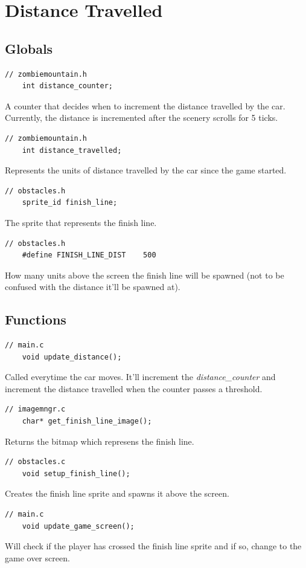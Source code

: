\documentclass{article}
\begin{document}
\section{Distance Travelled}
\subsection*{Globals}
\begin{lstlisting}[style=CStyle]
	// zombiemountain.h
	int distance_counter;
\end{lstlisting}
A counter that decides when to increment the distance travelled by the car. Currently, the distance is incremented after the scenery scrolls for 5 ticks.
\begin{lstlisting}[style=CStyle]
	// zombiemountain.h
	int distance_travelled;
\end{lstlisting}
Represents the units of distance travelled by the car since the game started. 
\begin{lstlisting}[style=CStyle]
	// obstacles.h
	sprite_id finish_line;
\end{lstlisting}
The sprite that represents the finish line.
\begin{lstlisting}[style=CStyle]
	// obstacles.h
	#define FINISH_LINE_DIST	500
\end{lstlisting}
How many units above the screen the finish line will be spawned (not to be confused with the distance it'll be spawned at). 
\newline

\subsection*{Functions}
\begin{lstlisting}[style=CStyle]
	// main.c
	void update_distance();
\end{lstlisting}
Called everytime the car moves. It'll increment the \emph{distance\_counter} and increment the distance travelled when the counter passes a threshold.
\begin{lstlisting}[style=CStyle]
	// imagemngr.c
	char* get_finish_line_image();
\end{lstlisting}
Returns the bitmap which represens the finish line.
\begin{lstlisting}[style=CStyle]
	// obstacles.c
	void setup_finish_line();
\end{lstlisting}
Creates the finish line sprite and spawns it above the screen.
\begin{lstlisting}[style=CStyle]
	// main.c
	void update_game_screen();
\end{lstlisting}
Will check if the player has crossed the finish line sprite and if so, change to the game over screen. 
\newline
\end{document}

